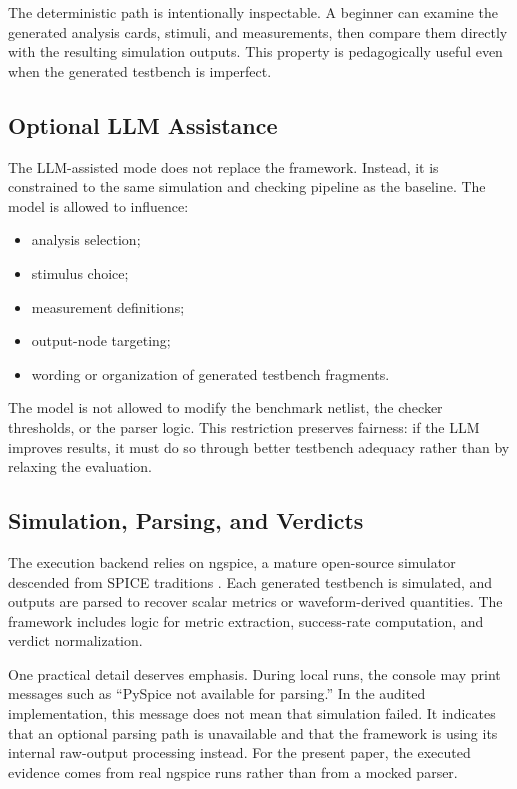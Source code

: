 \documentclass[conference]{IEEEtran}
\begin{document}
The deterministic path is intentionally inspectable. A beginner can examine the generated analysis cards, stimuli, and measurements, then compare them directly with the resulting simulation outputs. This property is pedagogically useful even when the generated testbench is imperfect.

\subsection{Optional LLM Assistance}
The LLM-assisted mode does not replace the framework. Instead, it is constrained to the same simulation and checking pipeline as the baseline. The model is allowed to influence:

\begin{itemize}
\item analysis selection;
\item stimulus choice;
\item measurement definitions;
\item output-node targeting;
\item wording or organization of generated testbench fragments.
\end{itemize}

The model is not allowed to modify the benchmark netlist, the checker thresholds, or the parser logic. This restriction preserves fairness: if the LLM improves results, it must do so through better testbench adequacy rather than by relaxing the evaluation.

\subsection{Simulation, Parsing, and Verdicts}
The execution backend relies on ngspice, a mature open-source simulator descended from SPICE traditions \cite{nagel1973spice,vladimirescu1994spice,ngspice2026}. Each generated testbench is simulated, and outputs are parsed to recover scalar metrics or waveform-derived quantities. The framework includes logic for metric extraction, success-rate computation, and verdict normalization.

One practical detail deserves emphasis. During local runs, the console may print messages such as ``PySpice not available for parsing.'' In the audited implementation, this message does not mean that simulation failed. It indicates that an optional parsing path is unavailable and that the framework is using its internal raw-output processing instead. For the present paper, the executed evidence comes from real ngspice runs rather than from a mocked parser.
\end{document}
